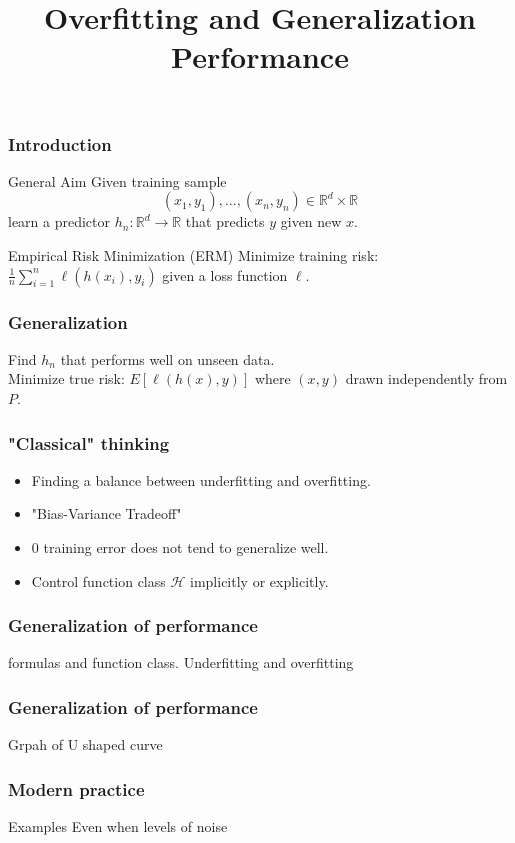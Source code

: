 \documentclass{beamer}
\title[About Beamer] %
{Overfitting and Generalization Performance}
\begin{document}
	
\frame{\titlepage}
	
\begin{frame}
\frametitle{Introduction}
	
	\begin{block}{General Aim}
		Given training sample \[(x_1, y_1), ..., (x_n, y_n) \in \mathbb{R}^d \times \mathbb{R}\]
		learn a predictor 
		$h_n : \mathbb{R}^d \to \mathbb{R}$ that predicts $y$ given new $x$.
	\end{block}
	
	\begin{block}{Empirical Risk Minimization (ERM)}
		Minimize training risk:
		$\frac{1}{n} \sum_{i=1}^{n}\ell(h(x_i), y_i) $
		given a loss function $\ell$.
	\end{block}

\end{frame}

\begin{frame}
\frametitle{Generalization}

Find $h_n$ that performs well on unseen data.\\
Minimize true risk: $E[\ell (h(x), y)]$
where  $(x, y)$ drawn independently from $P$.


\end{frame}

\begin{frame}
\frametitle{"Classical" thinking}
\begin{itemize}[itemsep = 12pt]
	\item Finding a balance between underfitting and overfitting.
	\item "Bias-Variance Tradeoff"
	\item 0 training error does not tend to generalize well.
	\item Control function class $\mathcal{H}$ implicitly or explicitly.
\end{itemize}
\end{frame}

\begin{frame}
\frametitle{Generalization of performance}
formulas and function class. Underfitting and overfitting
\end{frame}

\begin{frame}
\frametitle{Generalization of performance}
Grpah of U shaped curve
\end{frame}

\begin{frame}
\frametitle{Modern practice}
Examples
Even when levels of noise
\end{frame}
\end{document}
